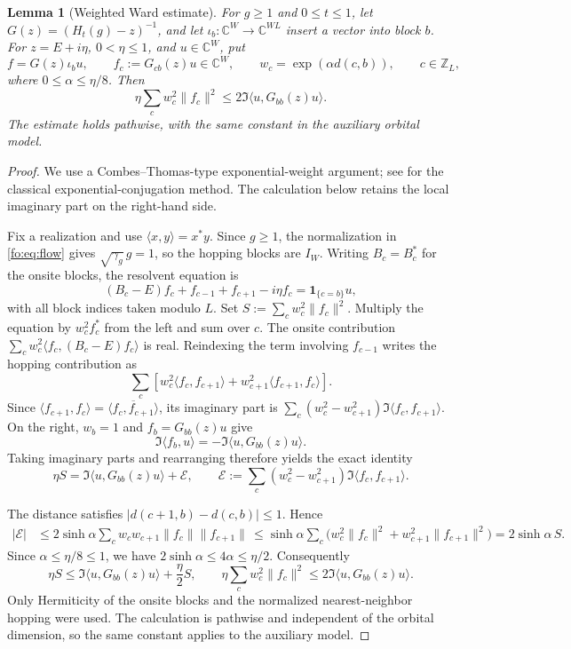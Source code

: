 \documentclass[11pt]{article}
\numberwithin{equation}{section}
\newtheorem{lemma}[theorem]{Lemma}
\theoremstyle{remark}
\newcommand{\Z}{\mathbb Z}
\newcommand{\C}{\mathbb C}
\newcommand{\one}{\mathbf 1}
\begin{document}
\begin{lemma}[Weighted Ward estimate]\label{uvc:lem:weighted-ward}
For $g\ge1$ and $0\le t\le1$, let $G(z)=(H_t(g)-z)^{-1}$, and let
$\iota_b:\C^W\to\C^{WL}$ insert a vector into block $b$.
For $z=E+i\eta$, $0<\eta\le1$, and $u\in\C^W$, put
\[
 f=G(z)\iota_bu,\qquad f_c:=G_{cb}(z)u\in\C^W,\qquad
 w_c=\exp(\alpha d(c,b)),\qquad c\in\Z_L,
\]
where $0\le\alpha\le\eta/8$.
Then
\[
 \eta\sum_c w_c^2\|f_c\|^2
       \le 2\Im\langle u,G_{bb}(z)u\rangle.
\]
The estimate holds pathwise, with the same constant in the auxiliary
orbital model.
\end{lemma}
\begin{proof}
We use a Combes--Thomas-type exponential-weight argument; see
\cite[Appendix~A.2, p.~827]{GKT} for the classical exponential-conjugation
method. The calculation below retains the local imaginary part on the
right-hand side.

Fix a realization and use $\langle x,y\rangle=x^*y$.
Since $g\ge1$, the normalization in \eqref{fo:eq:flow} gives
$\sqrt{\gamma_g}\,g=1$, so the hopping blocks are $I_W$.
Writing $B_c=B_c^*$ for the onsite blocks, the resolvent equation is
\[
 (B_c-E)f_c+f_{c-1}+f_{c+1}-i\eta f_c
       =\one_{\{c=b\}}u,
\]
with all block indices taken modulo $L$. Set
$S:=\sum_cw_c^2\|f_c\|^2$. Multiply the equation by $w_c^2f_c^*$
from the left and sum over $c$. The onsite contribution
$\sum_cw_c^2\langle f_c,(B_c-E)f_c\rangle$ is real.
Reindexing the term involving $f_{c-1}$ writes the hopping contribution as
\[
 \sum_c\left[
 w_c^2\langle f_c,f_{c+1}\rangle
 +w_{c+1}^2\langle f_{c+1},f_c\rangle\right].
\]
Since $\langle f_{c+1},f_c\rangle
=\overline{\langle f_c,f_{c+1}\rangle}$, its imaginary part is
$\sum_c(w_c^2-w_{c+1}^2)\Im\langle f_c,f_{c+1}\rangle$.
On the right, $w_b=1$ and $f_b=G_{bb}(z)u$ give
\[
 \Im\langle f_b,u\rangle
       =-\Im\langle u,G_{bb}(z)u\rangle.
\]
Taking imaginary parts and rearranging therefore yields the exact identity
\[
 \eta S=\Im\langle u,G_{bb}(z)u\rangle+\mathcal E,\qquad
 \mathcal E:=\sum_c(w_c^2-w_{c+1}^2)
                    \Im\langle f_c,f_{c+1}\rangle.
\]

The distance satisfies $|d(c+1,b)-d(c,b)|\le1$. Hence
 \[ \begin{aligned}
 |\mathcal E|
 &\le2\sinh\alpha\sum_cw_cw_{c+1}\|f_c\|\|f_{c+1}\|\,\le\sinh\alpha\sum_c
       \bigl(w_c^2\|f_c\|^2+w_{c+1}^2\|f_{c+1}\|^2\bigr)
 =2\sinh\alpha\,S.
 \end{aligned}
\]
Since $\alpha\le\eta/8\le1$, we have
$2\sinh\alpha\le4\alpha\le\eta/2$. Consequently
\[
 \eta S\le\Im\langle u,G_{bb}(z)u\rangle+\frac\eta2S,
 \qquad
 \eta\sum_cw_c^2\|f_c\|^2
       \le2\Im\langle u,G_{bb}(z)u\rangle.
\]
Only Hermiticity of the onsite blocks and the normalized nearest-neighbor
hopping were used. The calculation is pathwise and independent of the
orbital dimension, so the same constant applies to the auxiliary model.
\end{proof}
\end{document}
